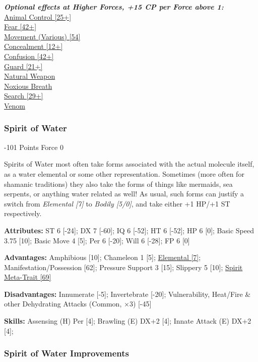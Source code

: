 \begin{multicols*}{3}
	\textbf{\textit{Optional effects at Higher Forces, +15 CP per Force above 1:\\}}
	\hyperref[animal_control]{Animal Control [25+]}\\
	\hyperref[fear]{Fear [42+]}\\
	\hyperref[movement]{Movement (Various) [54]}\\
	\hyperref[concealment]{Concealment [12+]}\\
	\hyperref[confusion]{Confusion [42+]}\\
	\hyperref[guard]{Guard [21+]}\\
	\hyperref[natural_weapon]{Natural Weapon}\\
	\hyperref[noxious_breath]{Noxious Breath}\\
	\hyperref[search]{Search [29+]}\\
	\hyperref[venom]{Venom}\\
	
	\subsubsection{Spirit of Water}
	\begin{flushright}
		-101 Points Force 0
	\end{flushright}
	
	Spirits of Water most often take forms associated with the actual molecule itself, as a water elemental or some other representation. Sometimes (more often for shamanic traditions) they also take the forms of things like mermaids, sea serpents, or anything water related as well! As usual, such forms can justify a switch from \textit{Elemental [7]} to \textit{Bodily [5/0]}, and take either +1 HP/+1 ST respectively.
	
	\textbf{Attributes:}
	ST 6 [-24]; DX 7 [-60]; IQ 6 [-52]; HT 6 [-52]; HP 6 [0]; Basic Speed 3.75 [10]; Basic Move 4 [5]; Per 6 [-20]; Will 6 [-28]; FP 6 [0]
	
	\textbf{Advantages:}
	Amphibious [10]; Chameleon 1 [5]; \hyperref[elemental]{Elemental [7]}; Manifestation/Possession [62]; Pressure Support 3 [15]; Slippery 5 [10]; \hyperref[spirit_meta_trait]{Spirit Meta-Trait [69]}
	
	\textbf{Disadvantages:}
	Innumerate [-5]; Invertebrate [-20]; Vulnerability, Heat/Fire \& other Dehydrating Attacks (Common, \(\times3\)) [-45]
	
	\textbf{Skills:}
	Assensing (H) Per [4]; Brawling (E) DX+2 [4]; Innate Attack (E) DX+2 [4];
	
	\subsubsection*{Spirit of Water Improvements}
	

\end{multicols*}
